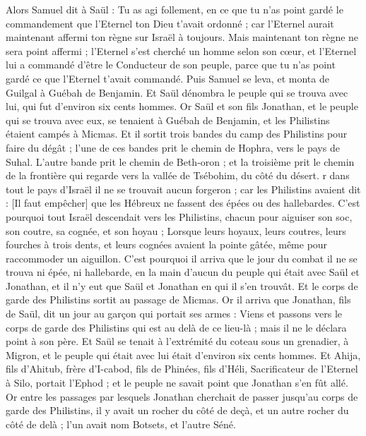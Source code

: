 \begin{multicols}{2}
Alors Samuel dit à Saül : Tu as agi follement, en ce que tu n'as point gardé le commandement que l'Eternel ton Dieu t'avait ordonné ; car l'Eternel aurait maintenant affermi ton règne sur Israël à toujours.
Mais maintenant ton règne ne sera point affermi ; l'Eternel s'est cherché un homme selon son cœur, et l'Eternel lui a commandé d'être le Conducteur de son peuple, parce que tu n'as point gardé ce que l'Eternel t'avait commandé.
Puis Samuel se leva, et monta de Guilgal à Guébah de Benjamin. Et Saül dénombra le peuple qui se trouva avec lui, qui fut d'environ six cents hommes.
Or Saül et son fils Jonathan, et le peuple qui se trouva avec eux, se tenaient à Guébah de Benjamin, et les Philistins étaient campés à Micmas.
Et il sortit trois bandes du camp des Philistins pour faire du dégât ; l'une de ces bandes prit le chemin de Hophra, vers le pays de Suhal.
L'autre bande prit le chemin de Beth-oron ; et la troisième prit le chemin de la frontière qui regarde vers la vallée de Tsébohim, du côté du désert.
r dans tout le pays d'Israël il ne se trouvait aucun forgeron ; car les Philistins avaient dit : [Il faut empêcher] que les Hébreux ne fassent des épées ou des hallebardes.
C'est pourquoi tout Israël descendait vers les Philistins, chacun pour aiguiser son soc, son coutre, sa cognée, et son hoyau ;
Lorsque leurs hoyaux, leurs coutres, leurs fourches à trois dents, et leurs cognées avaient la pointe gâtée, même pour raccommoder un aiguillon.
C'est pourquoi il arriva que le jour du combat il ne se trouva ni épée, ni hallebarde, en la main d'aucun du peuple qui était avec Saül et Jonathan, et il n'y eut que Saül et Jonathan en qui il s'en trouvât.
Et le corps de garde des Philistins sortit au passage de Micmas.
\VerseOne{}Or il arriva que Jonathan, fils de Saül, dit un jour au garçon qui portait ses armes : Viens et passons vers le corps de garde des Philistins qui est au delà de ce lieu-là ; mais il ne le déclara point à son père.
Et Saül se tenait à l'extrémité du coteau sous un grenadier, à Migron, et le peuple qui était avec lui était d'environ six cents hommes.
Et Ahija, fils d'Ahitub, frère d'I-cabod, fils de Phinées, fils d'Héli, Sacrificateur de l'Eternel à Silo, portait l'Ephod ; et le peuple ne savait point que Jonathan s'en fût allé.
Or entre les passages par lesquels Jonathan cherchait de passer jusqu'au corps de garde des Philistins, il y avait un rocher du côté de deçà, et un autre rocher du côté de delà ; l'un avait nom Botsets, et l'autre Séné.

\end{multicols}
